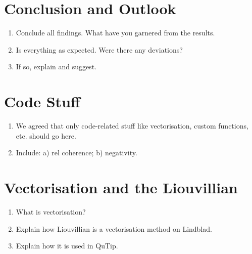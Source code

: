 \documentclass{article}
\begin{document}
\section{Conclusion and Outlook}
\begin{enumerate}
    \item Conclude all findings. What have you garnered from the results. 
    \item Is everything as expected. Were there any deviations?
    \item If so, explain and suggest. 
\end{enumerate}


\begin{appendices}
    \section{Code Stuff}
    \begin{enumerate}
        \item We agreed that only code-related stuff like vectorisation, custom functions, etc. should go here. 
        \item Include: a) rel coherence; b) negativity.
    \end{enumerate}
    \section{Vectorisation and the Liouvillian}
    \begin{enumerate}
        \item What is vectorisation?
        \item Explain how Liouvillian is a vectorisation method on Lindblad. 
        \item Explain how it is used in QuTip. 
    \end{enumerate}
\end{appendices}
\newpage

 
 
\end{document}
